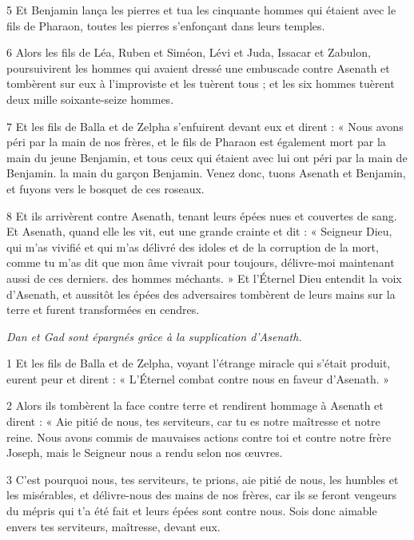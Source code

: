 \par 5 Et Benjamin lança les pierres et tua les cinquante hommes qui étaient avec le fils de Pharaon, toutes les pierres s'enfonçant dans leurs temples.

\par 6 Alors les fils de Léa, Ruben et Siméon, Lévi et Juda, Issacar et Zabulon, poursuivirent les hommes qui avaient dressé une embuscade contre Asenath et tombèrent sur eux à l'improviste et les tuèrent tous ; et les six hommes tuèrent deux mille soixante-seize hommes.

\par 7 Et les fils de Balla et de Zelpha s'enfuirent devant eux et dirent : « Nous avons péri par la main de nos frères, et le fils de Pharaon est également mort par la main du jeune Benjamin, et tous ceux qui étaient avec lui ont péri par la main de Benjamin. la main du garçon Benjamin. Venez donc, tuons Asenath et Benjamin, et fuyons vers le bosquet de ces roseaux.

\par 8 Et ils arrivèrent contre Asenath, tenant leurs épées nues et couvertes de sang. Et Asenath, quand elle les vit, eut une grande crainte et dit : « Seigneur Dieu, qui m'as vivifié et qui m'as délivré des idoles et de la corruption de la mort, comme tu m'as dit que mon âme vivrait pour toujours, délivre-moi maintenant aussi de ces derniers. des hommes méchants. » Et l'Éternel Dieu entendit la voix d'Asenath, et aussitôt les épées des adversaires tombèrent de leurs mains sur la terre et furent transformées en cendres.


\par \textit{Dan et Gad sont épargnés grâce à la supplication d'Asenath.}


\par 1 Et les fils de Balla et de Zelpha, voyant l'étrange miracle qui s'était produit, eurent peur et dirent : « L'Éternel combat contre nous en faveur d'Asenath. »

\par 2 Alors ils tombèrent la face contre terre et rendirent hommage à Asenath et dirent : « Aie pitié de nous, tes serviteurs, car tu es notre maîtresse et notre reine. Nous avons commis de mauvaises actions contre toi et contre notre frère Joseph, mais le Seigneur nous a rendu selon nos œuvres.

\par 3 C'est pourquoi nous, tes serviteurs, te prions, aie pitié de nous, les humbles et les misérables, et délivre-nous des mains de nos frères, car ils se feront vengeurs du mépris qui t'a été fait et leurs épées sont contre nous. Sois donc aimable envers tes serviteurs, maîtresse, devant eux.

